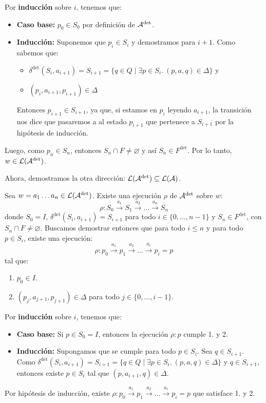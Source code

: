 Por \textbf{inducción} sobre $i$, tenemos que:
\begin{itemize}
    \item \textbf{Caso base:} $p_0 \in S_0$ por definición de $\mathcal{A}^\text{det}$.
    \item \textbf{Inducción:} Suponemos que $p_i \in S_i$ y demostramos para $i+1$. Como sabemos que:
          \begin{itemize}
              \item $\delta^\text{det}(S_i,a_{i+1})=S_{i+1} = \{q \in Q \mid \exists p \in S_i.\ (p,a,q) \in \Delta \}$ y
              \item $(p_i,a_{i+1},p_{i+1}) \in \Delta$
          \end{itemize}
          Entonces $p_{i+1} \in S_{i+1}$, ya que, si estamos en $p_i$ leyendo $a_{i+1}$, la transición nos dice que pasaremos a al estado $p_{i+1}$ que pertenece a $S_{i+1}$ por la hipótesis de inducción.
\end{itemize}
Luego, como $p_n \in S_n$, entonces $S_n \cap F \neq \varnothing$ y así $S_n \in F^\text{det}$. Por lo tanto, $w \in \mathcal{L}(\mathcal{A}^\text{det})$. \medbreak

Ahora, demostramos la otra dirección: $\mathcal{L}(\mathcal{A}^\text{det}) \subseteq \mathcal{L}(\mathcal{A})$. \medbreak

Sea $w = a_1\ldots a_n \in \mathcal{L}(\mathcal{A}^\text{det})$. Existe una ejecución $\rho$ de $\mathcal{A}^\text{det}$ sobre $w$:
$$
    \rho: S_0 \stackrel{a_1}{\rightarrow} S_1 \stackrel{a_2}{\rightarrow} \ldots \stackrel{a_n}{\rightarrow} S_n
$$
donde $S_0 = I$, $\delta^\text{det}(S_i, a_{i+1}) = S_{i+1}$ para todo $i \in \{0,\ldots,n-1\}$ y $S_n \in F^\text{det}$, con $S_n \cap F \neq \varnothing$. Buscamos demostrar entonces que para todo $i \leq n$ y para todo $p \in S_i$, existe una ejecución:
$$
    \rho: p_0 \stackrel{a_1}{\rightarrow} p_1 \stackrel{a_2}{\rightarrow} \ldots \stackrel{a_i}{\rightarrow} p_i=p
$$
tal que:
\begin{enumerate}
    \item $p_0 \in I$.
    \item $(p_j, a_{j+1}, p_{j+1}) \in \Delta$ para todo $j \in \{0,\ldots,i-1\}$.
\end{enumerate}
Por \textbf{inducción} sobre $i$, tenemos que:
\begin{itemize}
    \item \textbf{Caso base:} Si $p \in S_0 = I$, entonces la ejecución $\rho: p$ cumple 1. y 2.
    \item \textbf{Inducción:} Supongamos que se cumple para todo $p \in S_i$. Sea $q \in S_{i+1}$. Como $\delta^\text{det}(S_i,a_{i+1})=S_{i+1}=\{q \in Q \mid \exists p \in S_i.\ (p,a,q)\in \Delta\}$ y $q \in S_{i+1}$, entonces existe $p \in S_i$ tal que $(p,a_{i+1},q) \in \Delta$.
\end{itemize}
Por hipótesis de inducción, existe $\rho: p_0 \stackrel{a_1}{\rightarrow} p_1 \stackrel{a_2}{\rightarrow} \ldots \stackrel{a_i}{\rightarrow} p_i=p$ que satisface 1. y 2. \medbreak


